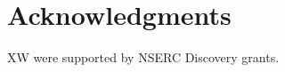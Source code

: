 \documentclass[12pt]{article}
\begin{document}
\section*{Acknowledgments}
    XW were supported by NSERC Discovery grants.






\end{document}
